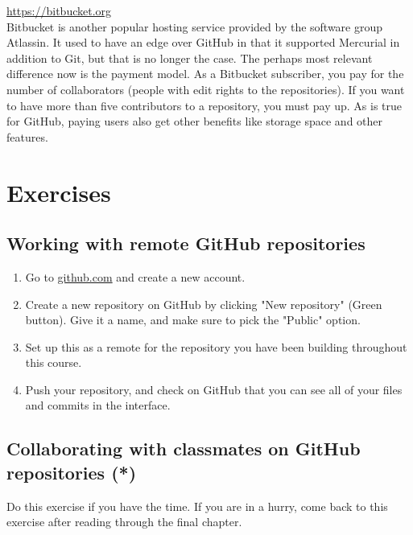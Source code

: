 \documentclass[../main/git_course_main.tex]{subfiles}
\begin{document}
	\url{https://bitbucket.org} \\
	
	Bitbucket is another popular hosting service provided by the software group Atlassin. It used to have an edge over GitHub in that it supported Mercurial in addition to Git, but that is no longer the case. The perhaps most relevant difference now is the payment model. As a Bitbucket subscriber, you pay for the number of collaborators (people with edit rights to the repositories). If you want to have more than five contributors to a repository, you must pay up. As is true for GitHub, paying users also get other benefits like storage space and other features.
	
	\newpage
	\section{Exercises}
	
	\subsection{Working with remote GitHub repositories}
	
	\begin{enumerate}
		
		\item Go to \url{github.com} and create a new account.
		\item Create a new repository on GitHub by clicking "New repository" (Green button). Give it a name, and make sure to pick the "Public" option.
		\item Set up this as a remote for the repository you have been building throughout this course.
		\item Push your repository, and check on GitHub that you can see all of your files and commits in the interface.
	\end{enumerate}
	
	\subsection{Collaborating with classmates on GitHub repositories (*)}
	
	Do this exercise if you have the time. If you are in a hurry, come back to this exercise after reading through the final chapter.
	
\end{document}
